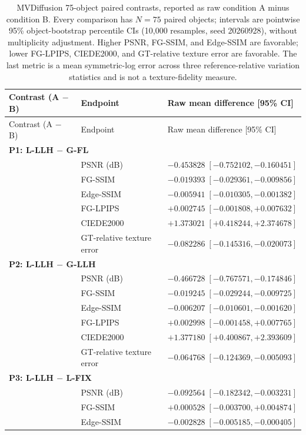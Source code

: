 \documentclass[11pt]{article}
\begin{document}
\begingroup\scriptsize
\setlength{\tabcolsep}{3pt}
\begin{longtable}{p{4.0cm}p{3.1cm}p{7.2cm}}
\caption{MVDiffusion 75-object paired contrasts, reported as raw condition A minus condition B. Every comparison has $N=75$ paired objects; intervals are pointwise 95\% object-bootstrap percentile CIs (10,000 resamples, seed 20260928), without multiplicity adjustment. Higher PSNR, FG-SSIM, and Edge-SSIM are favorable; lower FG-LPIPS, CIEDE2000, and GT-relative texture error are favorable. The last metric is a mean symmetric-log error across three reference-relative variation statistics and is not a texture-fidelity measure.}\label{tab:mvdiffusion-raw-paired}\\
\toprule
Contrast (A $-$ B) & Endpoint & Raw mean difference [95\% CI] \\
\midrule\endfirsthead
\toprule Contrast (A $-$ B) & Endpoint & Raw mean difference [95\% CI] \\
\midrule\endhead
\multicolumn{3}{l}{\textbf{P1: L-LLH $-$ G-FL}}\\
& PSNR (dB) & $-0.453828\;[-0.752102,-0.160451]$ \\
& FG-SSIM & $-0.019393\;[-0.029361,-0.009856]$ \\
& Edge-SSIM & $-0.005941\;[-0.010305,-0.001382]$ \\
& FG-LPIPS & $+0.002745\;[-0.001808,+0.007632]$ \\
& CIEDE2000 & $+1.373021\;[+0.418244,+2.374678]$ \\
& GT-relative texture error & $-0.082286\;[-0.145316,-0.020073]$ \\
\multicolumn{3}{l}{\textbf{P2: L-LLH $-$ G-LLH}}\\
& PSNR (dB) & $-0.466728\;[-0.767571,-0.174846]$ \\
& FG-SSIM & $-0.019245\;[-0.029244,-0.009725]$ \\
& Edge-SSIM & $-0.006207\;[-0.010601,-0.001620]$ \\
& FG-LPIPS & $+0.002998\;[-0.001458,+0.007765]$ \\
& CIEDE2000 & $+1.377180\;[+0.400867,+2.393609]$ \\
& GT-relative texture error & $-0.064768\;[-0.124369,-0.005093]$ \\
\multicolumn{3}{l}{\textbf{P3: L-LLH $-$ L-FIX}}\\
& PSNR (dB) & $-0.092564\;[-0.182342,-0.003231]$ \\
& FG-SSIM & $+0.000528\;[-0.003700,+0.004874]$ \\
& Edge-SSIM & $-0.002828\;[-0.005185,-0.000405]$ \\

\end{longtable}
\end{document}

